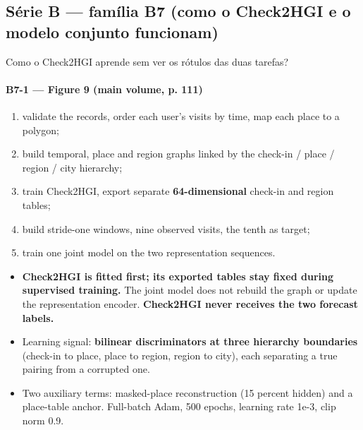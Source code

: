 \documentclass{beamer}
\begin{document}
\subsection{Série B --- família B7 (como o Check2HGI e o modelo conjunto funcionam)}

\begin{frame}[noframenumbering]{Como o Check2HGI aprende sem ver os rótulos das duas tarefas?}
    \framesubtitle{B7-1 --- Figure 9 (main volume, p. 111)}
    \hypertarget{b71}{}
    \small
    \begin{enumerate}\footnotesize\setlength{\itemsep}{0pt}\setlength{\parskip}{0pt}
        \item validate the records, order each user's visits by time, map each place to a polygon;
        \item build temporal, place and region graphs linked by the check-in / place / region / city hierarchy;
        \item train Check2HGI, export separate \textbf{64-dimensional} check-in and region tables;
        \item build stride-one windows, nine observed visits, the tenth as target;
        \item train one joint model on the two representation sequences.
    \end{enumerate}
    \begin{itemize}\setlength{\itemsep}{0pt}\setlength{\parskip}{0pt}
        \item \textcolor{alert}{\textbf{Check2HGI is fitted first; its exported tables stay fixed during supervised training.}} The joint model does not rebuild the graph or update the representation encoder. \textbf{Check2HGI never receives the two forecast labels.}
        \item Learning signal: \textbf{bilinear discriminators at three hierarchy boundaries} (check-in to place, place to region, region to city), each separating a true pairing from a corrupted one.
        \item Two auxiliary terms: masked-place reconstruction (15 percent hidden) and a place-table anchor. Full-batch Adam, 500 epochs, learning rate 1e-3, clip norm 0.9.

\end{itemize}
\end{frame}
\end{document}
